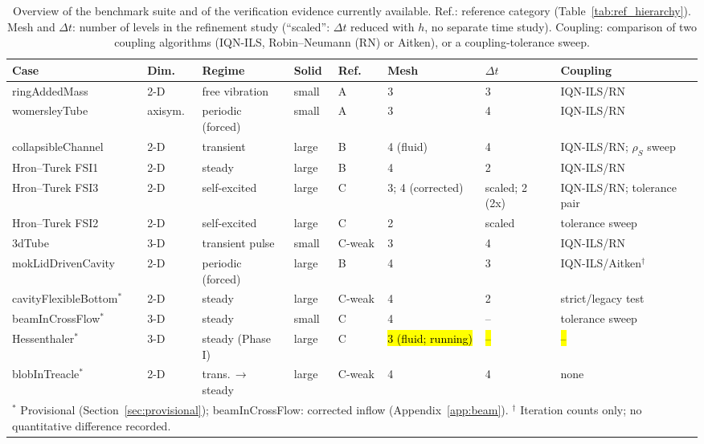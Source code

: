 \begin{table}[htbp]
	\centering
	\footnotesize
	\setlength{\tabcolsep}{3pt}
	\caption{Overview of the benchmark suite and of the verification evidence currently available. Ref.: reference category (Table~\ref{tab:ref_hierarchy}). Mesh and $\Delta t$: number of levels in the refinement study (``scaled'': $\Delta t$ reduced with $h$, no separate time study). Coupling: comparison of two coupling algorithms (IQN-ILS, Robin--Neumann (RN) or Aitken), or a coupling-tolerance sweep.}
	\label{tab:suite_overview}
	\begin{tabular}{llllllll}
		\toprule
		Case & Dim. & Regime & Solid & Ref. & Mesh & $\Delta t$ & Coupling \\
		\midrule
		ringAddedMass & 2-D & free vibration & small & A & 3 & 3 & IQN-ILS/RN \\
		womersleyTube & axisym. & periodic (forced) & small & A & 3 & 4 & IQN-ILS/RN \\
		collapsibleChannel & 2-D & transient & large & B & 4 (fluid) & 4 & IQN-ILS/RN; $\rho_S$ sweep \\
		Hron--Turek FSI1 & 2-D & steady & large & B & 4 & 2 & IQN-ILS/RN \\
		Hron--Turek FSI3 & 2-D & self-excited & large & C & 3; 4 (corrected) & scaled; 2 (2x) & IQN-ILS/RN; tolerance pair \\
		Hron--Turek FSI2 & 2-D & self-excited & large & C & 2 & scaled & tolerance sweep \\
		3dTube & 3-D & transient pulse & small & C-weak & 3 & 4 & IQN-ILS/RN \\
		mokLidDrivenCavity & 2-D & periodic (forced) & large & B & 4 & 3 & IQN-ILS/Aitken$^\dagger$ \\
		cavityFlexibleBottom$^\ast$ & 2-D & steady & large & C-weak & 4 & 2 & strict/legacy test \\
		beamInCrossFlow$^\ast$ & 3-D & steady & small & C & 4 & -- & tolerance sweep \\
		Hessenthaler$^\ast$ & 3-D & steady (Phase I) & large & C & \hl{3 (fluid; running)} & \hl{--} & \hl{--} \\
		blobInTreacle$^\ast$ & 2-D & trans.\,$\to$\,steady & large & C-weak & 4 & 4 & none \\
		\bottomrule
		\multicolumn{8}{l}{$^\ast$ Provisional (Section~\ref{sec:provisional}); beamInCrossFlow: corrected inflow (Appendix~\ref{app:beam}). $^\dagger$ Iteration counts only; no quantitative difference recorded.}
	\end{tabular}
\end{table}

